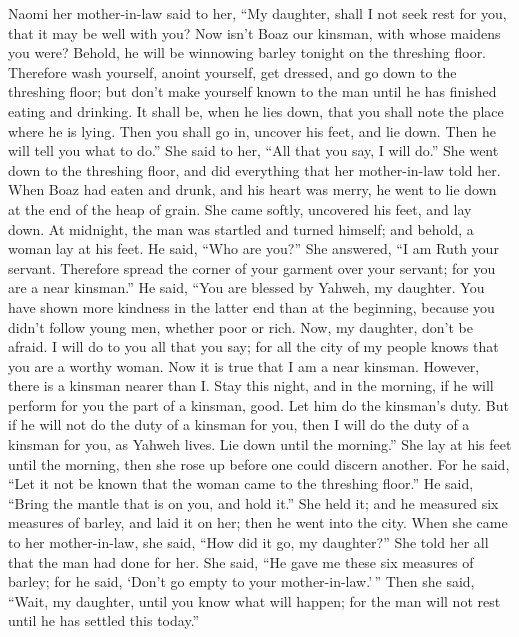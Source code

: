  Naomi her mother-in-law said to her, ``My daughter, shall
I not seek rest for you, that it may be well with you? 
Now isn't Boaz our kinsman, with whose maidens you were? Behold, he will
be winnowing barley tonight on the threshing floor. 
Therefore wash yourself, anoint yourself, get dressed, and go down to
the threshing floor; but don't make yourself known to the man until he
has finished eating and drinking.  It shall be, when he
lies down, that you shall note the place where he is lying. Then you
shall go in, uncover his feet, and lie down. Then he will tell you what
to do.''  She said to her, ``All that you say, I will
do.''  She went down to the threshing floor, and did
everything that her mother-in-law told her.  When Boaz had
eaten and drunk, and his heart was merry, he went to lie down at the end
of the heap of grain. She came softly, uncovered his feet, and lay down.
 At midnight, the man was startled and turned himself; and
behold, a woman lay at his feet.  He said, ``Who are
you?'' She answered, ``I am Ruth your servant. Therefore spread the
corner of your garment over your servant; for you are a near kinsman.''
 He said, ``You are blessed by Yahweh, my daughter. You
have shown more kindness in the latter end than at the beginning,
because you didn't follow young men, whether poor or rich.
 Now, my daughter, don't be afraid. I will do to you all
that you say; for all the city of my people knows that you are a worthy
woman.  Now it is true that I am a near kinsman. However,
there is a kinsman nearer than I.  Stay this night, and
in the morning, if he will perform for you the part of a kinsman, good.
Let him do the kinsman's duty. But if he will not do the duty of a
kinsman for you, then I will do the duty of a kinsman for you, as Yahweh
lives. Lie down until the morning.''  She lay at his feet
until the morning, then she rose up before one could discern another.
For he said, ``Let it not be known that the woman came to the threshing
floor.''  He said, ``Bring the mantle that is on you, and
hold it.'' She held it; and he measured six measures of barley, and laid
it on her; then he went into the city.  When she came to
her mother-in-law, she said, ``How did it go, my daughter?'' She told
her all that the man had done for her.  She said, ``He
gave me these six measures of barley; for he said, `Don't go empty to
your mother-in-law.'\,''  Then she said, ``Wait, my
daughter, until you know what will happen; for the man will not rest
until he has settled this today.''


